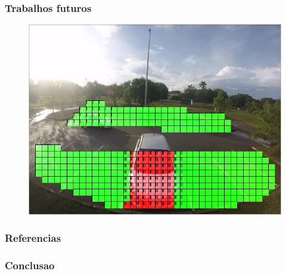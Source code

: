 \documentclass{beamer}
\begin{document}
\begin{frame}
\frametitle{Trabalhos futuros}
\begin{figure}
\centering
\includegraphics[height=.8\textheight]{preliminar}
\centering
\end{figure}

\end{frame}


\begin{frame}[allowframebreaks]
\frametitle{Referencias}



\end{frame}




\begin{frame}
\frametitle{Conclusao}
\huge
\cite{bong2008integrated} \cite{chen2012dynamic} \cite{de2006introduccao} \cite{delibaltov2013parking}\cite{gonzalez2009digital}
\cite{graciano2007rastreamento} \cite{hai2009self} \cite{IBGE2000introducao} \cite{idris09} \cite{marques1999processamento}
\cite{true2007vacant} \cite{vkl1989jain}
\end{frame}


\end{document}
